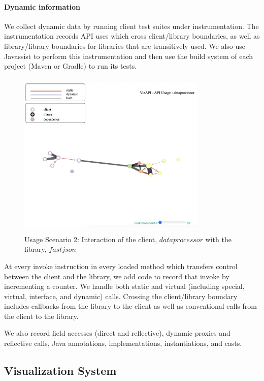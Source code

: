 \paragraph{Dynamic information} We collect dynamic data by running client
test suites under instrumentation. 
The instrumentation records API
uses which cross client/library boundaries, as well as library/library boundaries
for libraries that are transitively used. We also use
Javassist to perform this
instrumentation and then use the build system of each project (Maven or Gradle) to run its
tests. 





\begin{figure}[t]
\begin{center}
\includegraphics[scale=1,width=9cm,height=8cm]{images/usage-scenario2.png}
\caption{Usage Scenario 2: Interaction of the client, $dataprocessor$ with the library, $fastjson$}
\label{fig:usagescenario2}
\end{center}
\end{figure}

At every invoke instruction in every
loaded method which transfers control between the client and the
library, we add code to record that invoke by incrementing a counter.
We handle both static and virtual (including special, virtual,
interface, and dynamic) calls. Crossing the client/library boundary
includes callbacks from the library to the client as well as conventional
calls from the client to the library. 

We also record field accesses (direct and reflective), dynamic proxies
and reflective calls, Java annotations, implementations,
instantiations, and casts.

\subsection{Visualization System}
\label{subsec:vis-system}


